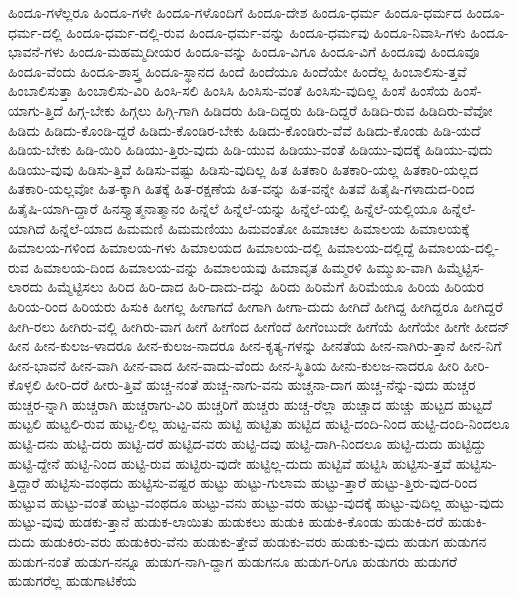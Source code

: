 {ಹಿಂದೂ-ಗಳೆಲ್ಲರೂ
ಹಿಂದೂ-ಗಳೇ
ಹಿಂದೂ-ಗಳೊಂದಿಗೆ
ಹಿಂದೂ-ದೇಶ
ಹಿಂದೂ-ಧರ್ಮ
ಹಿಂದೂ-ಧರ್ಮದ
ಹಿಂದೂ-ಧರ್ಮ-ದಲ್ಲಿ
ಹಿಂದೂ-ಧರ್ಮ-ದಲ್ಲಿ-ರುವ
ಹಿಂದೂ-ಧರ್ಮ-ವನ್ನು
ಹಿಂದೂ-ಧರ್ಮವು
ಹಿಂದೂ-ನಿವಾಸಿ-ಗಳು
ಹಿಂದೂ-ಭಾವನೆ-ಗಳು
ಹಿಂದೂ-ಮಹಮ್ಮದೀಯರ
ಹಿಂದೂ-ವನ್ನು
ಹಿಂದೂ-ವಿಗೂ
ಹಿಂದೂ-ವಿಗೆ
ಹಿಂದೂವು
ಹಿಂದೂವೂ
ಹಿಂದೂ-ವೆಂದು
ಹಿಂದೂ-ಶಾಸ್ತ್ರ
ಹಿಂದೂ-ಸ್ಥಾನದ
ಹಿಂದೆ
ಹಿಂದೆಯೂ
ಹಿಂದೆಯೇ
ಹಿಂದೆಲ್ಲ
ಹಿಂಬಾಲಿಸು-ತ್ತವೆ
ಹಿಂಬಾಲಿಸುತ್ತಾ
ಹಿಂಬಾಲಿಸು-ವಿರಿ
ಹಿಂಸಿ-ಸಲಿ
ಹಿಂಸಿಸಿ
ಹಿಂಸಿಸು-ವಂತೆ
ಹಿಂಸಿಸು-ವುದಿಲ್ಲ
ಹಿಂಸೆ
ಹಿಂಸೆಯ
ಹಿಂಸೆ-ಯಾಗು-ತ್ತಿದೆ
ಹಿಗ್ಗ-ಬೇಕು
ಹಿಗ್ಗಲು
ಹಿಗ್ಗಿ-ಗಾಗಿ
ಹಿಡಿದರು
ಹಿಡಿ-ದಿದ್ದರು
ಹಿಡಿ-ದಿದ್ದರೆ
ಹಿಡಿದಿ-ರುವ
ಹಿಡಿದಿರು-ವೆವೋ
ಹಿಡಿದು
ಹಿಡಿದು-ಕೊಂಡಿ-ದ್ದರೆ
ಹಿಡಿದು-ಕೊಂಡಿರ-ಬೇಕು
ಹಿಡಿದು-ಕೊಂಡಿರು-ವೆವೆ
ಹಿಡಿದು-ಕೊಂಡು
ಹಿಡಿ-ಯದೆ
ಹಿಡಿಯ-ಬೇಕು
ಹಿಡಿ-ಯಿರಿ
ಹಿಡಿಯು-ತ್ತಿರು-ವುದು
ಹಿಡಿ-ಯುವ
ಹಿಡಿಯು-ವಂತೆ
ಹಿಡಿಯು-ವುದಕ್ಕೆ
ಹಿಡಿಯು-ವುದು
ಹಿಡಿಯು-ವುವು
ಹಿಡಿಸು-ತ್ತಿವೆ
ಹಿಡಿಸು-ವಷ್ಟು
ಹಿಡಿಸು-ವುದಿಲ್ಲ
ಹಿತ
ಹಿತಕಾರಿ
ಹಿತಕಾರಿ-ಯಲ್ಲ
ಹಿತಕಾರಿ-ಯಲ್ಲದ
ಹಿತಕಾರಿ-ಯಲ್ಲವೋ
ಹಿತ-ಕ್ಕಾಗಿ
ಹಿತಕ್ಕೆ
ಹಿತ-ರಕ್ಷಣೆಯ
ಹಿತ-ವನ್ನು
ಹಿತ-ವನ್ನೇ
ಹಿತವೆ
ಹಿತೈಷಿ-ಗಳಾದುದ-ರಿಂದ
ಹಿತೈಷಿ-ಯಾಗಿ-ದ್ದಾರೆ
ಹಿನಸ್ತ್ಯಾತ್ಮನಾತ್ಮಾನಂ
ಹಿನ್ನೆಲೆ
ಹಿನ್ನೆಲೆ-ಯನ್ನು
ಹಿನ್ನೆಲೆ-ಯಲ್ಲಿ
ಹಿನ್ನೆಲೆ-ಯಲ್ಲಿಯೂ
ಹಿನ್ನೆಲೆ-ಯಾಗಿದೆ
ಹಿನ್ನೆಲೆ-ಯಾದ
ಹಿಮಮಣಿ
ಹಿಮಮಣಿಯು
ಹಿಮವಂತೋ
ಹಿಮಾಚಲ
ಹಿಮಾಲಯ
ಹಿಮಾಲಯಕ್ಕೆ
ಹಿಮಾಲಯ-ಗಳಿಂದ
ಹಿಮಾಲಯ-ಗಳು
ಹಿಮಾಲಯದ
ಹಿಮಾಲಯ-ದಲ್ಲಿ
ಹಿಮಾಲಯ-ದಲ್ಲಿದ್ದೆ
ಹಿಮಾಲಯ-ದಲ್ಲಿ-ರುವ
ಹಿಮಾಲಯ-ದಿಂದ
ಹಿಮಾಲಯ-ವನ್ನು
ಹಿಮಾಲಯವು
ಹಿಮಾವೃತ
ಹಿಮ್ಮರಳಿ
ಹಿಮ್ಮುಖ-ವಾಗಿ
ಹಿಮ್ಮೆಟ್ಟಿಸ-ಲಾರದು
ಹಿಮ್ಮೆಟ್ಟಿಸಲು
ಹಿರಿದ
ಹಿರಿ-ದಾದ
ಹಿರಿ-ದಾದು-ದನ್ನು
ಹಿರಿದು
ಹಿರಿಮೆಗೆ
ಹಿರಿಮೆಯೂ
ಹಿರಿಯ
ಹಿರಿಯರ
ಹಿರಿಯ-ರಿಂದ
ಹಿರಿಯರು
ಹಿಸುಕಿ
ಹೀಗಲ್ಲ
ಹೀಗಾಗದೆ
ಹೀಗಾಗಿ
ಹೀಗಾ-ದುದು
ಹೀಗಿದೆ
ಹೀಗಿದ್ದ
ಹೀಗಿದ್ದರೂ
ಹೀಗಿದ್ದರೆ
ಹೀಗಿ-ರಲು
ಹೀಗಿರು-ವಲ್ಲಿ
ಹೀಗಿರು-ವಾಗ
ಹೀಗೆ
ಹೀಗೆಂದ
ಹೀಗೆಂದೆ
ಹೀಗೆಂಬುದೇ
ಹೀಗೆಯೆ
ಹೀಗೆಯೇ
ಹೀಗೇ
ಹೀದನ್
ಹೀನ
ಹೀನ-ಕುಲಜ-ಳಾದರೂ
ಹೀನ-ಕುಲಜ-ನಾದರೂ
ಹೀನ-ಕೃತ್ಯ-ಗಳನ್ನು
ಹೀನತೆಯ
ಹೀನ-ನಾಗಿರು-ತ್ತಾನೆ
ಹೀನ-ನಿಗೆ
ಹೀನ-ಭಾವನೆ
ಹೀನ-ವಾಗಿ
ಹೀನ-ವಾದ
ಹೀನ-ವಾದು-ವೆಂದು
ಹೀನ-ಸ್ಥಿತಿಯ
ಹೀನು-ಕುಲಜ-ನಾದರೂ
ಹೀರಿ
ಹೀರಿ-ಕೊಳ್ಳಲಿ
ಹೀರಿ-ದರೆ
ಹೀರು-ತ್ತಿವೆ
ಹುಚ್ಚ-ನಂತೆ
ಹುಚ್ಚ-ನಾಗು-ವನು
ಹುಚ್ಚನಾ-ದಾಗ
ಹುಚ್ಚ-ನೆನ್ನು-ವುದು
ಹುಚ್ಚರ
ಹುಚ್ಚರ-ನ್ನಾಗಿ
ಹುಚ್ಚರಾಗಿ
ಹುಚ್ಚರಾಗು-ವಿರಿ
ಹುಚ್ಚರಿಗೆ
ಹುಚ್ಚರು
ಹುಚ್ಚ-ರೆಲ್ಲಾ
ಹುಚ್ಚಾದ
ಹುಚ್ಚು
ಹುಟ್ಟದ
ಹುಟ್ಟದೆ
ಹುಟ್ಟಲಿ
ಹುಟ್ಟಲಿ-ರುವ
ಹುಟ್ಟ-ಲಿಲ್ಲ
ಹುಟ್ಟ-ವನು
ಹುಟ್ಟಿ
ಹುಟ್ಟಿತು
ಹುಟ್ಟಿದ
ಹುಟ್ಟಿ-ದಂದಿ-ನಿಂದ
ಹುಟ್ಟಿ-ದಂದಿ-ನಿಂದಲೂ
ಹುಟ್ಟಿ-ದನು
ಹುಟ್ಟಿ-ದರು
ಹುಟ್ಟಿ-ದರೆ
ಹುಟ್ಟಿದ-ವರು
ಹುಟ್ಟಿ-ದವು
ಹುಟ್ಟಿ-ದಾಗಿ-ನಿಂದಲೂ
ಹುಟ್ಟಿ-ದುದು
ಹುಟ್ಟಿದ್ದು
ಹುಟ್ಟಿ-ದ್ದೇನೆ
ಹುಟ್ಟಿ-ನಿಂದ
ಹುಟ್ಟಿ-ರುವ
ಹುಟ್ಟಿರು-ವುದೇ
ಹುಟ್ಟಿಲ್ಲ-ದುದು
ಹುಟ್ಟಿವೆ
ಹುಟ್ಟಿಸಿ
ಹುಟ್ಟಿಸು-ತ್ತವೆ
ಹುಟ್ಟಿಸು-ತ್ತಿದ್ದಾರೆ
ಹುಟ್ಟಿಸು-ವಂಥದು
ಹುಟ್ಟಿಸು-ವಷ್ಟರ
ಹುಟ್ಟು
ಹುಟ್ಟು-ಗುಲಾಮ
ಹುಟ್ಟು-ತ್ತಾರೆ
ಹುಟ್ಟು-ತ್ತಿರು-ವುದ-ರಿಂದ
ಹುಟ್ಟುವ
ಹುಟ್ಟು-ವಂತೆ
ಹುಟ್ಟು-ವಂಥದೂ
ಹುಟ್ಟು-ವನು
ಹುಟ್ಟು-ವರು
ಹುಟ್ಟು-ವುದಕ್ಕೆ
ಹುಟ್ಟು-ವುದಿಲ್ಲ
ಹುಟ್ಟು-ವುದು
ಹುಟ್ಟು-ವುವು
ಹುಡಕು-ತ್ತಾನೆ
ಹುಡುಕ-ಲಾಯಿತು
ಹುಡುಕಲು
ಹುಡುಕಿ
ಹುಡುಕಿ-ಕೊಂಡು
ಹುಡುಕಿ-ದರೆ
ಹುಡುಕಿ-ದುದು
ಹುಡುಕಿರು-ವರು
ಹುಡುಕಿರು-ವೆನು
ಹುಡುಕು-ತ್ತೇವೆ
ಹುಡುಕು-ವರು
ಹುಡುಕು-ವುದು
ಹುಡುಗ
ಹುಡುಗನ
ಹುಡುಗ-ನಂತೆ
ಹುಡುಗ-ನನ್ನೂ
ಹುಡುಗ-ನಾಗಿ-ದ್ದಾಗ
ಹುಡುಗನೂ
ಹುಡುಗ-ರಿಗೂ
ಹುಡುಗರು
ಹುಡುಗರೆ
ಹುಡುಗರೆಲ್ಲ
ಹುಡುಗಾಟಿಕೆಯ
}
